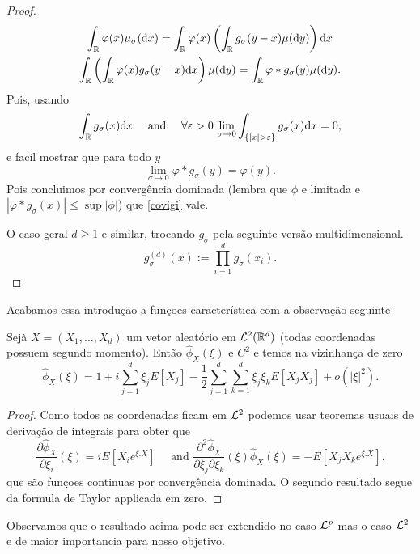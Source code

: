 \begin{proof}
\begin{multline}
 \int_{{\mathbb R}} \varphi(x)\mu_{\sigma}( \mathrm{d} x)= \int_{{\mathbb R}} \varphi(x) \left(\int_{{\mathbb R}} g_\sigma(y-x) \mu(\mathrm{d} y)\right) \mathrm{d} x \\
   \int_{{\mathbb R}} \left( \int_{{\mathbb R}} \varphi(x)  g_\sigma(y-x) \mathrm{d} x \right) \mu(\mathrm{d} y)=  \int_{{\mathbb R}}  \varphi\ast g_\sigma(y) \mu(\mathrm{d} y).
 \end{multline}
Pois, usando  
\begin{equation}
 \int_{\bbR} g_\sigma(x) \dd x \quad \text{ and } \quad \forall \gep>0  \, \lim_{\sigma\to 0} \int_{\{ |x|>\gep \}} g_\sigma(x) \dd x=0, 
\end{equation}
e facil mostrar que para todo $y$ 
\begin{equation}
  \lim_{\sigma \to 0} \varphi\ast g_\sigma(y)=\varphi(y).
\end{equation}
Pois concluimos por convergência dominada (lembra que $\phi$ e limitada e $|\varphi\ast g_\sigma(x)|\le \sup |\phi|$) que \eqref{covigi} vale.

\medskip

O caso geral $d\ge 1$ e similar, trocando $g_{\sigma}$ pela seguinte versão multidimensional. 
$$g_{\sigma}^{(d)}(x):=\prod_{i=1}^d g_{\sigma}(x_i).$$
\end{proof}


Acabamos essa introdução a funçoes característica com a observação seguinte

\begin{proposition}\label{prop:taylorcara}
 Sejà $X=(X_1,\dots,X_d)$ um vetor aleatório em ${\mathcal L}^2({\mathbb R}^d)$ (todas coordenadas possuem segundo momento). Então $\hat \phi_X(\xi)$ e $C^2$ e
 temos na vizinhança de zero
 \begin{equation}\label{taylorblabla}
  \hat \phi_X(\xi)=1+i \sum_{j=1}^d \xi_j E[X_j]- \frac{1}{2} \sum_{j=1}^d\sum_{k=1}^d \xi_j \xi_k E[X_j X_j]+ o(|\xi|^2).
 \end{equation}
\end{proposition}

  \begin{proof}
   Como todos as coordenadas ficam em ${\mathcal L}^2$ podemos usar teoremas usuais de derivação de integrais  para obter que 
   \begin{equation}
    \frac{\partial  \hat \phi_X}{\partial \xi_i}(\xi)=  iE[X_i e^{\xi.X}] \quad \text{ and }  \frac{\partial^2  \hat \phi_X}{\partial \xi_j \partial \xi_k}(\xi) 
    \hat \phi_X(\xi)=-E[X_jX_k e^{\xi.X}].
   \end{equation}
   que são funçoes continuas por convergência dominada.
O segundo resultado segue da formula de Taylor applicada em zero.
  \end{proof}
Observamos que o resultado acima pode ser extendido no caso ${\mathcal L}^p$ mas o caso ${\mathcal L}^2$ e de maior importancia para nosso objetivo. 


